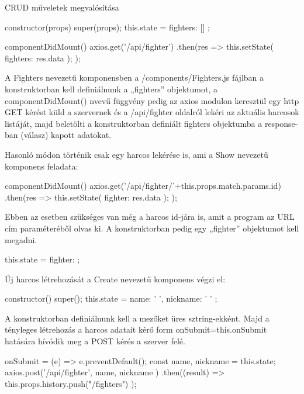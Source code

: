 
CRUD műveletek megvalósítása

\begin{cpp}
constructor(props) {
    super(props);
    this.state = {
      fighters: []
    };
  }

  componentDidMount() {
    axios.get('/api/fighter')
      .then(res => {
        this.setState({ fighters: res.data });
      });
  }
\end{cpp}

A Fighters nevezetű komponensben a /components/Fighters.js fájlban a konstruktorban kell definiálnunk a „fighters” objektumot, a componentDidMount() nvevű függvény pedig az axios modulon keresztül egy http GET kérést küld a szervernek és a /api/fighter oldalról lekéri az aktuális harcosok listáját, majd beletölti a konstruktorban definiált fighters objektumba a response-ban (válasz) kapott adatokat.

Hasonló módon történik csak egy harcos lekérése is, ami a Show nevezetű komponens feladata:

\begin{cpp}
componentDidMount() {
    axios.get('/api/fighter/'+this.props.match.params.id)
      .then(res => {
        this.setState({ fighter: res.data });
      });
  }
\end{cpp}

Ebben az esetben szükséges van még a harcos id-jára is, amit a program az URL cím paraméteréből olvas ki. A konstruktorban pedig egy „fighter” objektumot kell megadni.

\begin{cpp}
this.state = { fighter: {} };
\end{cpp}

Új harcos létrehozását a Create nevezetű komponens végzi el:

\begin{cpp}
constructor() {
    super();
    this.state = {
      name: ' ',
      nickname: ' '
    };}
\end{cpp}

A konstruktorban definiálnunk kell a mezőket üres sztring-ekként. Majd a tényleges létrehozás a harcos adatait kérő form onSubmit={this.onSubmit} hatására hívódik meg a POST kérés a szerver felé.

\begin{cpp}
onSubmit = (e) => {
    e.preventDefault();
    const { name, nickname} = this.state;
    axios.post('/api/fighter', { name, nickname })
      .then((result) => {
        this.props.history.push("/fighters")
      }); }
\end{cpp}

